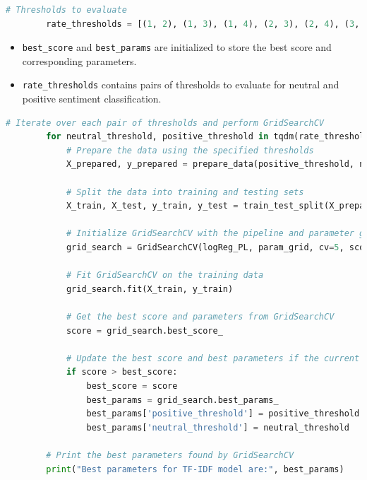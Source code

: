 \documentclass{solutionclass} %
\begin{document}
\begin{solution}
\begin{lstlisting}[language=Python]
        # Thresholds to evaluate
        rate_thresholds = [(1, 2), (1, 3), (1, 4), (2, 3), (2, 4), (3, 4)]
        \end{lstlisting}
        
        \begin{itemize}
            \item \texttt{best\_score} and \texttt{best\_params} are initialized to store the best score and corresponding parameters.
            \item \texttt{rate\_thresholds} contains pairs of thresholds to evaluate for neutral and positive sentiment classification.
        \end{itemize}
        
        \begin{lstlisting}[language=Python]
        # Iterate over each pair of thresholds and perform GridSearchCV
        for neutral_threshold, positive_threshold in tqdm(rate_thresholds):
            # Prepare the data using the specified thresholds
            X_prepared, y_prepared = prepare_data(positive_threshold, neutral_threshold)
            
            # Split the data into training and testing sets
            X_train, X_test, y_train, y_test = train_test_split(X_prepared, y_prepared, test_size=0.1, random_state=42)
            
            # Initialize GridSearchCV with the pipeline and parameter grid
            grid_search = GridSearchCV(logReg_PL, param_grid, cv=5, scoring='accuracy')
            
            # Fit GridSearchCV on the training data
            grid_search.fit(X_train, y_train)
            
            # Get the best score and parameters from GridSearchCV
            score = grid_search.best_score_
            
            # Update the best score and best parameters if the current score is better
            if score > best_score:
                best_score = score
                best_params = grid_search.best_params_
                best_params['positive_threshold'] = positive_threshold
                best_params['neutral_threshold'] = neutral_threshold
        
        # Print the best parameters found by GridSearchCV
        print("Best parameters for TF-IDF model are:", best_params)
        \end{lstlisting}
        

\end{solution}
\end{document}
